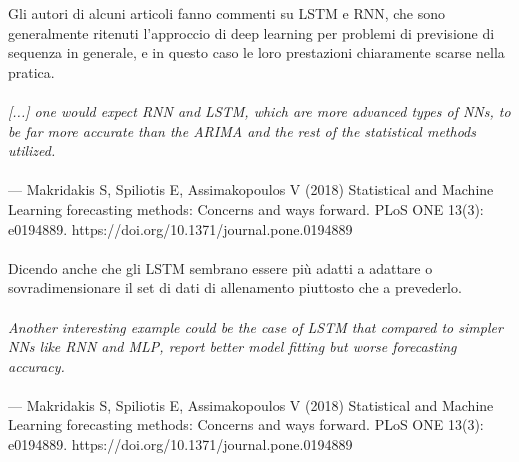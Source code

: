 \documentclass[12pt,a4paper]{report}
\begin{document}
Gli autori di alcuni articoli fanno commenti su LSTM e RNN, che sono generalmente ritenuti l'approccio di deep learning per problemi di previsione di sequenza in generale, e in questo caso le loro prestazioni chiaramente scarse nella pratica.\\
\\
\emph{[...] one would expect RNN and LSTM, which are more advanced types of NNs, to be far more accurate than the ARIMA and the rest of the statistical methods utilized.}\\
\\
—  Makridakis S, Spiliotis E, Assimakopoulos V (2018) Statistical and Machine Learning forecasting methods: Concerns and ways forward. PLoS ONE 13(3): e0194889. https://doi.org/10.1371/journal.pone.0194889\\
\\
Dicendo anche che gli LSTM sembrano essere più adatti a adattare o sovradimensionare il set di dati di allenamento piuttosto che a prevederlo.\\
\\
\emph{Another interesting example could be the case of LSTM that compared to simpler NNs like RNN and MLP, report better model fitting but worse forecasting accuracy.}\\
\\
—  Makridakis S, Spiliotis E, Assimakopoulos V (2018) Statistical and Machine Learning forecasting methods: Concerns and ways forward. PLoS ONE 13(3): e0194889. https://doi.org/10.1371/journal.pone.0194889\\
\\
\end{document}

